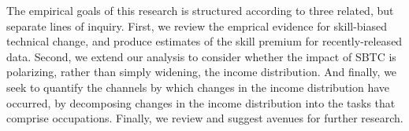 The empirical goals of this research is structured according to three related, but separate lines of inquiry. First, we review the emprical evidence for skill-biased technical change, and produce estimates of the skill premium for recently-released data. Second, we extend our analysis to consider whether the impact of SBTC is polarizing, rather than simply widening, the income distribution. And finally, we seek to quantify the channels by which changes in the income distribution have occurred, by  decomposing changes in the income distribution into the tasks that comprise occupations. Finally, we review and suggest avenues for further research.

